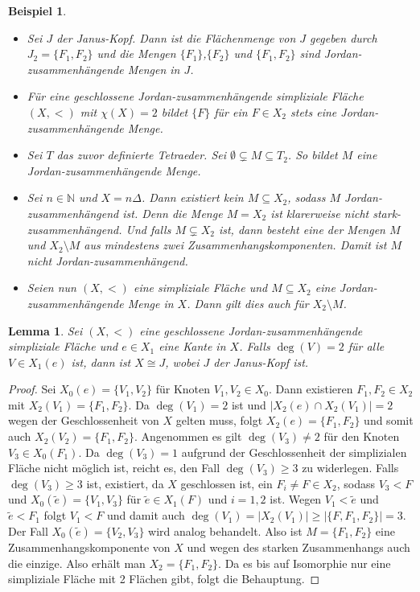 \documentclass[12pt,titlepage,twoside,cleardoublepage]{article}
\theoremstyle{nummermitklammern}
\newtheorem{lemma}[temp]{Lemma}
\newtheorem{bsp}[temp]{Beispiel}
\newtheorem{lemma}[zahl]{Lemma}
\newtheorem{bsp}[zahl]{Beispiel}
\numberwithin{equation}{section}
\begin{document}
\begin{bsp}
\begin{itemize}
\item Sei $J$ der Janus-Kopf. Dann ist die Flächenmenge von $J$ gegeben durch $J_2=\{F_1,F_2\}$ und die Mengen $\{F_1\}$,$\{F_2\}$ und $\{F_1,F_2\}$ sind Jordan-zusammenhängende Mengen in $J$.
\item Für eine geschlossene Jordan-zusammenhängende simpliziale Fläche $(X,<)$ mit $\chi(X)=2$ bildet $\{F\}$ für ein $F \in X_2$ stets eine Jordan-zusammenhängende Menge.
\item Sei $T$ das zuvor definierte Tetraeder. Sei $\emptyset \subsetneq M \subseteq T_2$. So bildet $M$ eine Jordan-zusammenhängende Menge.
\item Sei $n\in \mathbb{N}$ und $X=n \Delta$. Dann existiert kein $M \subseteq X_2$, sodass $M$ Jordan-zusammenhängend ist. Denn die Menge $ M = X_2$ ist klarerweise nicht stark-zusammenhängend. Und falls $M \subsetneq X_2$ ist, dann besteht eine der Mengen $M$ und $X_2\setminus M$ aus mindestens zwei Zusammenhangskomponenten. Damit ist $M$ nicht Jordan-zusammenhängend.
\item Seien nun $(X,<)$ eine simpliziale Fläche und $M \subseteq X_2$ eine Jordan- zusammenhängende Menge in $X$. Dann gilt dies auch für $X_2\setminus M$.
\end{itemize}
\end{bsp}
\begin{lemma}\label{lemmajanus}
 Sei $(X,<)$ eine geschlossene Jordan-zusammenhängende simpliziale Fläche und $e\in X_1$ eine Kante in $X$. Falls $\deg(V)=2$ für alle $V \in X_1(e)$ ist, dann ist $X \cong J$, wobei $J$ der Janus-Kopf ist.
\end{lemma}
\begin{proof}
Sei $X_0(e)=\{V_1,V_2\}$ für Knoten $V_1,V_2 \in X_0$. Dann existieren $F_1,F_2 \in X_2$ mit $X_2(V_1)=\{F_1,F_2\}$. Da $\deg(V_1)=2$ ist und $\vert X_2(e) \cap X_2(V_1)\vert =2$ wegen der Geschlossenheit von $X$ gelten muss, folgt $X_2(e)=\{F_1,F_2\}$ und somit auch $X_2(V_2)=\{F_1,F_2\}$. Angenommen es gilt $\deg(V_3)\neq 2$ für den Knoten $V_3 \in X_0(F_1)$. Da $\deg(V_3)=1$ aufgrund der Geschlossenheit der simplizialen Fläche nicht möglich ist, reicht es, den Fall $\deg(V_3)\geq 3$ zu widerlegen. Falls $\deg(V_3)\geq 3$ ist, existiert, da $X$ geschlossen ist, ein $F_i \neq F\in X_2$, sodass $V_3<F$ und $X_0(\tilde{e})=\{V_1,V_3\}$ für $\tilde{e}\in X_1(F)$ und $i=1,2$ ist. Wegen $V_1< \tilde{e}$ und $ \tilde{e}<F_1$ folgt $V_1<F$ und damit auch $\deg (V_1)=\vert X_2(V_1) \vert\geq \vert\{F,F_1,F_2\}\vert=3$. Der Fall $X_0(\tilde{e})=\{V_2,V_3\}$ wird analog behandelt. Also ist $M=\{F_1,F_2\}$ eine Zusammenhangskomponente von $X$ und wegen des starken Zusammenhangs auch die einzige. Also erhält man $X_2=\{F_1,F_2\}$. Da es bis auf Isomorphie nur eine simpliziale Fläche mit 2 Flächen gibt, folgt die Behauptung.
\end{proof}
\end{document}

